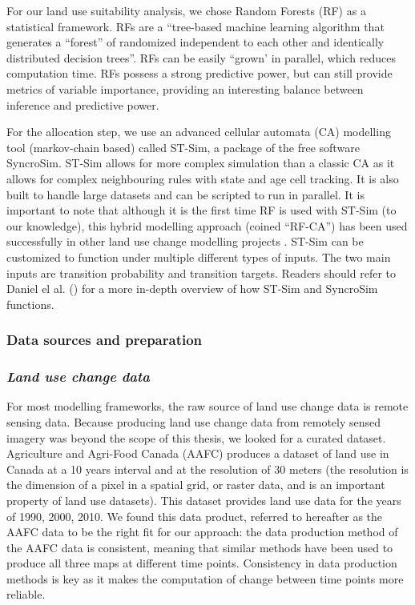 For our land use suitability analysis, we chose Random Forests (RF) as a statistical framework. RFs are a “tree-based machine learning algorithm that generates a “forest” of randomized independent to each other and identically distributed decision trees”. RFs can be easily “grown’ in parallel, which reduces computation time. RFs possess a strong predictive power, but can still provide metrics of variable importance, providing an interesting balance between inference and predictive power.

For the allocation step, we use an advanced cellular automata (CA) modelling tool (markov-chain based) called ST-Sim, a package of the free software SyncroSim. ST-Sim allows for more complex simulation than a classic CA as it allows for complex neighbouring rules with state and age cell tracking. It is also built to handle large datasets and can be scripted to run in parallel. It is important to note that although it is the first time RF is used with ST-Sim (to our knowledge), this hybrid modelling approach (coined “RF-CA”) has been used successfully in other land use change modelling projects \citep{kamusoko_simulating_2015, gounaridis_random_2019}. ST-Sim can be customized to function under multiple different types of inputs. The two main inputs are transition probability and transition targets. Readers should refer to Daniel el al. (\citeyear{daniel_state-and-transition_2016}) for a more in-depth overview of how ST-Sim and SyncroSim functions. \\

\subsubsection{Data sources and preparation}

\subsubsection*{\textit{Land use change data}}

For most modelling frameworks, the raw source of land use change data is remote sensing data. Because producing land use change data from remotely sensed imagery was beyond the scope of this thesis, we looked for a curated dataset. Agriculture and Agri-Food Canada (AAFC) produces a dataset of land use in Canada at a 10 years interval and at the resolution of 30 meters (the resolution is the dimension of a pixel in a spatial grid, or raster data, and is an important property of land use datasets). This dataset provides land use data for the years of 1990, 2000, 2010. We found this data product, referred to hereafter as the AAFC data  to be the right fit for our approach: the data production method of the AAFC  data is consistent, meaning that similar methods have been used to produce all three maps at different time points. Consistency in data production methods is key as it makes the computation of change between time points more reliable.


